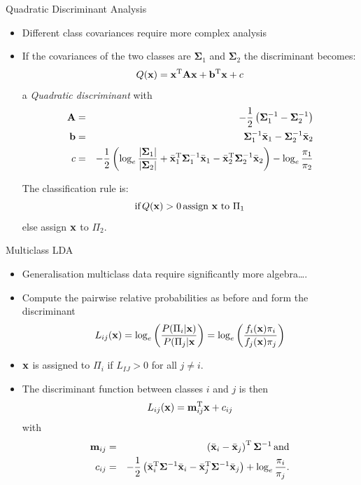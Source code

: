 \documentclass[aspectratio=169]{beamer}
\begin{document}
\begin{frame}{Quadratic Discriminant Analysis}
  \begin{itemize}
    \item Different class covariances require more complex analysis
    \item If the covariances of the two classes are $\mathbf{\Sigma}_1$ and $\mathbf{\Sigma}_2$ the discriminant becomes:
      \begin{equation*}
        Q(\mathbf{x}) = \mathbf{x}^{\mathrm{T}}\mathbf{A}\mathbf{x} + \mathbf{b}^{\mathrm{T}}\mathbf{x} + c
      \end{equation*}
      a \textit{Quadratic discriminant} with
      \begin{eqnarray*}
        \mathbf{A} &=& -\frac{1}{2}\left(\mathbf{\Sigma}_1^{-1}-\mathbf{\Sigma}_2^{-1}\right) \\
        \mathbf{b} &=& \mathbf{\Sigma}^{-1}_1\bar{\mathbf{x}}_1 - \mathbf{\Sigma}^{-1}_2\bar{\mathbf{x}}_2 \\
        c &=& -\frac{1}{2}\left(\log_e\frac{\left\lvert \mathbf{\Sigma}_1\right\rvert}{\left\lvert \mathbf{\Sigma}_2\right\rvert}+\bar{\mathbf{x}}_1^{\mathrm{T}}\mathbf{\Sigma}_1^{-1}\bar{\mathbf{x}}_1-\bar{\mathbf{x}}_2^{\mathrm{T}}\mathbf{\Sigma}_2^{-1}\bar{\mathbf{x}}_2\right)-\log_e\frac{\pi_1}{\pi_2}
      \end{eqnarray*}

      The classification rule is:
      \begin{equation*}
        \mbox{if}\,Q(\mathbf{x})>0\,\mbox{assign $\mathbf{x}$ to $\Pi_1$}
      \end{equation*}
      else assign $\mathbf{x}$ to $\Pi_2$. 
  \end{itemize}
\end{frame}

\begin{frame}{Multiclass LDA}
  \begin{itemize}
    \item Generalisation multiclass data require significantly more algebra\dots.
    \item Compute the pairwise relative probabilities as before and form the discriminant
      \begin{equation*}
        L_{ij}(\mathbf{x}) = \log_e\left(\frac{P(\Pi_i|\mathbf{x})}{P(\Pi_j|\mathbf{x}}\right)=\log_e\left(\frac{f_i(\mathbf{x})\pi_i}{f_j(\mathbf{x})\pi_j}\right)
      \end{equation*}
    \item $\mathbf{x}$ is assigned to $\Pi_i$ if $L_{IJ}>0$ for all $j\neq i$. 
    \item The discriminant function between classes $i$ and $j$ is then
      \begin{equation*}
        L_{ij}(\mathbf{x}) =\mathbf{m}^{\mathrm{T}}_{ij}\mathbf{x}+c_{ij}
      \end{equation*}
      with 
      \begin{eqnarray*}
        \mathbf{m}_{ij} &=& \left(\bar{\mathbf{x}}_i-\bar{\mathbf{x}}_j\right)^{\mathrm{T}}\mathbf{\Sigma}^{-1}\, \mbox{and}\\
        c_{ij}&=&-\frac{1}{2}\left(\bar{\mathbf{x}}_i^{\mathrm{T}}\mathbf{\Sigma}^{-1}\bar{\mathbf{x}}_i - \bar{\mathbf{x}}_j^{\mathrm{T}}\mathbf{\Sigma}^{-1}\bar{\mathbf{x}}_j\right)+\log_e\frac{\pi_i}{\pi_j}.
      \end{eqnarray*}
  \end{itemize}
\end{frame}
\end{document}
